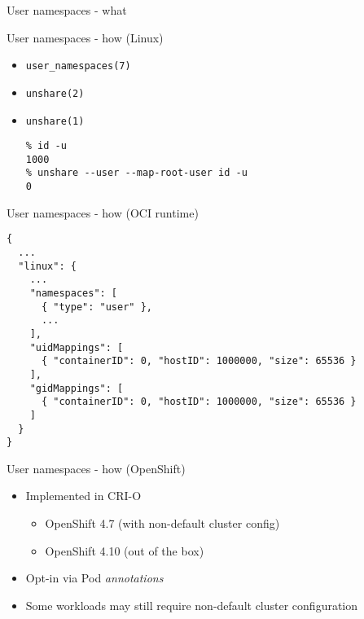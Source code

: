 \documentclass[ignorenonframetext,aspectratio=169,12pt]{beamer}
\def\svgwidth{4cm}
\begin{document}
\begin{frame}{User namespaces - what}
\protect\hypertarget{userns-what}{}
\begin{center}
\def\svgwidth{\textwidth}

\end{center}
\end{frame}

\begin{frame}[fragile]{User namespaces - how (Linux)}
\protect\hypertarget{userns-how-linux}{}
\begin{itemize}
    \item {\tt user\_namespaces(7)}
    \item {\tt unshare(2)}
    \item {\tt unshare(1)}
\begin{lstlisting}
% id -u
1000
% unshare --user --map-root-user id -u
0
\end{lstlisting}
\end{itemize}
\end{frame}

\begin{frame}[fragile]{User namespaces - how (OCI runtime)}
\protect\hypertarget{userns-how-oci}{}
\begin{lstlisting}[basicstyle=\ttfamily\small]
{
  ...
  "linux": {
    ...
    "namespaces": [
      { "type": "user" },
      ...
    ],
    "uidMappings": [
      { "containerID": 0, "hostID": 1000000, "size": 65536 }
    ],
    "gidMappings": [
      { "containerID": 0, "hostID": 1000000, "size": 65536 }
    ]
  }
}
\end{lstlisting}
\end{frame}

\begin{frame}{User namespaces - how (OpenShift)}
\protect\hypertarget{userns-how-openshift}{}
\begin{itemize}
  \item Implemented in CRI-O
    \begin{itemize}
      \item OpenShift 4.7 (with non-default cluster config)
      \item OpenShift 4.10 (out of the box)
    \end{itemize}
  \item Opt-in via Pod {\em annotations}
  \item Some workloads may still require non-default cluster
    configuration
\end{itemize}
\end{frame}
\end{document}
